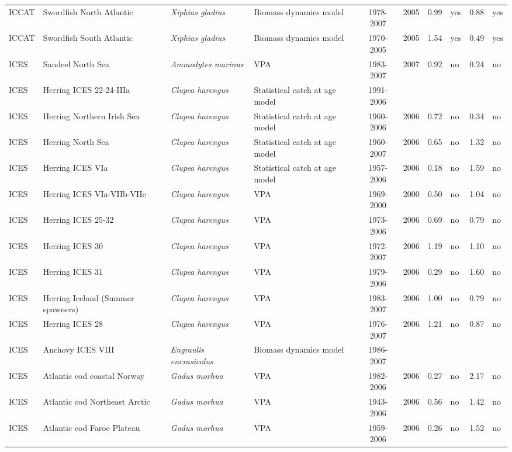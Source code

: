 \begin{longtable}{p{1.8cm}p{3.5cm}p{3.5cm}p{3cm}cccp{0.9cm}cp{0.9cm}}
  ICCAT & Swordfish North Atlantic & \textit{Xiphias gladius} & Biomass dynamics model & 1978-2007 & 2005 & 0.99 & yes & 0.88 & yes \\ 
  ICCAT & Swordfish South Atlantic & \textit{Xiphias gladius} & Biomass dynamics model & 1970-2005 & 2005 & 1.54 & yes & 0.49 & yes \\ 
  ICES & Sandeel North Sea & \textit{Ammodytes marinus} & VPA & 1983-2007 & 2007 & 0.92 & no & 0.24 & no \\ 
  ICES & Herring ICES 22-24-IIIa & \textit{Clupea harengus} & Statistical catch at age model & 1991-2006 &  &  &  &  &  \\ 
  ICES & Herring Northern Irish Sea & \textit{Clupea harengus} & Statistical catch at age model & 1960-2006 & 2006 & 0.72 & no & 0.34 & no \\ 
  ICES & Herring North Sea & \textit{Clupea harengus} & Statistical catch at age model & 1960-2007 & 2006 & 0.65 & no & 1.32 & no \\ 
  ICES & Herring ICES VIa & \textit{Clupea harengus} & Statistical catch at age model & 1957-2006 & 2006 & 0.18 & no & 1.59 & no \\ 
  ICES & Herring ICES VIa-VIIb-VIIc & \textit{Clupea harengus} & VPA & 1969-2000 & 2000 & 0.50 & no & 1.04 & no \\ 
  ICES & Herring ICES 25-32 & \textit{Clupea harengus} & VPA & 1973-2006 & 2006 & 0.69 & no & 0.79 & no \\ 
  ICES & Herring ICES 30 & \textit{Clupea harengus} & VPA & 1972-2007 & 2006 & 1.19 & no & 1.10 & no \\ 
  ICES & Herring ICES 31 & \textit{Clupea harengus} & VPA & 1979-2006 & 2006 & 0.29 & no & 1.60 & no \\ 
  ICES & Herring Iceland (Summer spawners) & \textit{Clupea harengus} & VPA & 1983-2007 & 2006 & 1.00 & no & 0.79 & no \\ 
  ICES & Herring ICES 28 & \textit{Clupea harengus} & VPA & 1976-2007 & 2006 & 1.21 & no & 0.87 & no \\ 
  ICES & Anchovy ICES VIII & \textit{Engraulis encrasicolus} & Biomass dynamics model & 1986-2007 &  &  &  &  &  \\ 
  ICES & Atlantic cod coastal Norway & \textit{Gadus morhua} & VPA & 1982-2006 & 2006 & 0.27 & no & 2.17 & no \\ 
  ICES & Atlantic cod Northeast Arctic & \textit{Gadus morhua} & VPA & 1943-2006 & 2006 & 0.56 & no & 1.42 & no \\ 
  ICES & Atlantic cod Faroe Plateau & \textit{Gadus morhua} & VPA & 1959-2006 & 2006 & 0.26 & no & 1.52 & no \\ 

\end{longtable}
